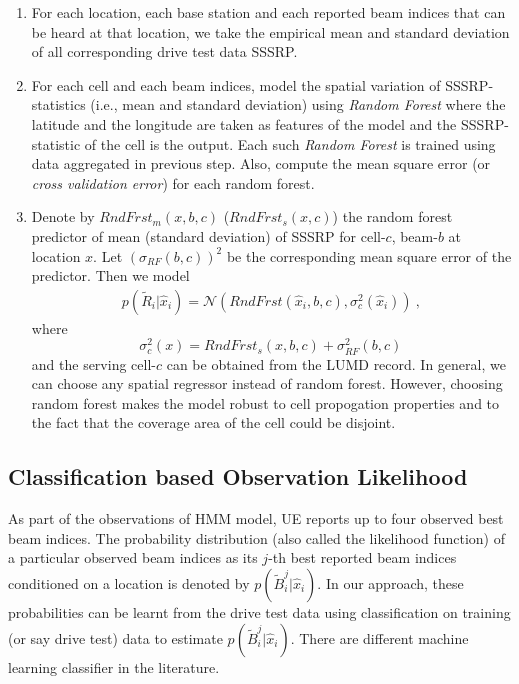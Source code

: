 \documentclass[conference, 10pt]{IEEEtran}
\begin{document}
\begin{enumerate}
\item For each location, each base station and each reported beam indices that can be heard at that location, we
take the empirical mean and standard deviation of all corresponding drive test data
SSSRP. 

\item For each cell and each beam indices, model the spatial variation of SSSRP-statistics (i.e., mean and
standard deviation) using {\em Random Forest} where the latitude and the longitude are 
taken as features of the model and the SSSRP-statistic  of the cell is the output. Each such {\em
Random Forest} is trained using data aggregated in previous step. Also,
compute the mean square error (or {\em cross validation error})
for each random forest.

\item Denote by $RndFrst_m(x,b,c)$ ($RndFrst_s(x,c)$) the random forest predictor of
mean (standard deviation) of SSSRP for cell-$c$, beam-$b$
at location $x$. Let $(\sigma_{RF}(b,c))^2$ be the corresponding
mean square error of the predictor. Then we model
\begin{align}
p(\tilde{R}_i|\hat{x}_{i}) =
\mathcal{N}(RndFrst(\hat{x}_{i},b,c), \sigma_c^2(\hat{x}_i))\ ,
\label{eqn:rndfrst}
\end{align}
where $$\sigma_c^2(x) = RndFrst_s(x,b,c) + \sigma_{RF}^2(b,c)\,$$ 
and the serving cell-$c$ can be obtained from the LUMD record. In general, we
can choose any spatial regressor instead of random forest. However, choosing
random forest makes the model robust to cell propogation properties and to the
fact that the coverage area of the cell could be disjoint.
\end{enumerate}

\subsection{Classification based Observation Likelihood}
\label{sec:prob-classification}
As part of the observations of HMM model, UE reports up to four observed best beam indices. The probability
distribution (also called the likelihood function) of a particular observed beam indices as its $j$-th best reported beam indices
conditioned on a location is denoted by
$p(\tilde{B}^j_i|\hat{x}_{i})$. In our approach, these probabilities
can be learnt from the drive test data using classification on training (or say drive test) data to
estimate $p(\tilde{B}^j_i|\hat{x}_{i})$.
There are different machine learning classifier in the literature.
\end{document}
